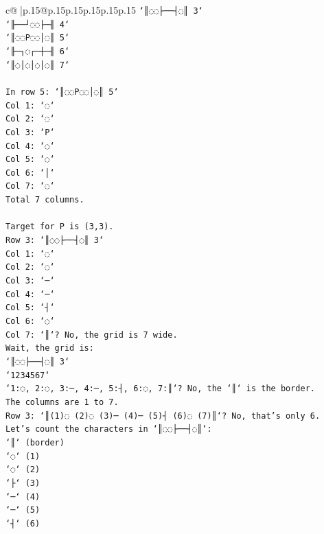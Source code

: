 \documentclass{article}
\begin{document}
{\begin{supertabular}{c@{$\;$}|p{.15\linewidth}@{}p{.15\linewidth}p{.15\linewidth}p{.15\linewidth}p{.15\linewidth}p{.15\linewidth}}
{{{\texttt{`║◌◌├──┤◌║ 3`} \\
\texttt{`╟──┘◌◌├─╢ 4`} \\
\texttt{`║◌◌P◌◌│◌║ 5`} \\
\texttt{`╟─┐◌┌─┼─╢ 6`} \\
\texttt{`║◌│◌│◌│◌║ 7`} \\
\\ 
\texttt{In row 5: `║◌◌P◌◌│◌║ 5`} \\
\texttt{Col 1: `◌`} \\
\texttt{Col 2: `◌`} \\
\texttt{Col 3: `P`} \\
\texttt{Col 4: `◌`} \\
\texttt{Col 5: `◌`} \\
\texttt{Col 6: `│`} \\
\texttt{Col 7: `◌`} \\
\texttt{Total 7 columns.} \\
\\ 
\texttt{Target for P is (3,3).} \\
\texttt{Row 3: `║◌◌├──┤◌║ 3`} \\
\texttt{Col 1: `◌`} \\
\texttt{Col 2: `◌`} \\
\texttt{Col 3: `─`} \\
\texttt{Col 4: `─`} \\
\texttt{Col 5: `┤`} \\
\texttt{Col 6: `◌`} \\
\texttt{Col 7: `║`? No, the grid is 7 wide.} \\
\texttt{Wait, the grid is:} \\
\texttt{`║◌◌├──┤◌║ 3`} \\
\texttt{`1234567`} \\
\texttt{`1:◌, 2:◌, 3:─, 4:─, 5:┤, 6:◌, 7:║`? No, the `║` is the border.} \\
\texttt{The columns are 1 to 7.} \\
\texttt{Row 3: `║(1)◌ (2)◌ (3)─ (4)─ (5)┤ (6)◌ (7)║`? No, that's only 6.} \\
\texttt{Let's count the characters in `║◌◌├──┤◌║`:} \\
\texttt{`║` (border)} \\
\texttt{`◌` (1)} \\
\texttt{`◌` (2)} \\
\texttt{`├` (3)} \\
\texttt{`─` (4)} \\
\texttt{`─` (5)} \\
\texttt{`┤` (6)} \\
}}}
\end{supertabular}}
\end{document}
